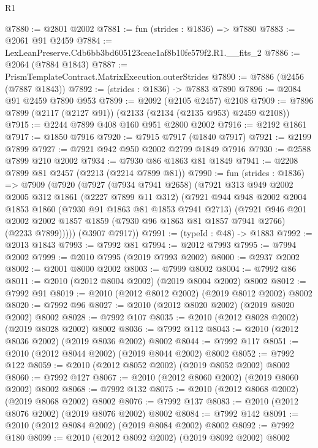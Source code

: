 \begin{lexlean}{R1}
\begin{coremodule}
@7880 := @2801 @2002
@7881 := fun (strides : @1836) => @7880
@7883 := @2061 @91 @2459
@7884 := LexLeanPreserve.Cdb6bb3bd605123ceae1af8b10fe579f2.R1.__fits_2
@7886 := @2064 (@7884 @1843)
@7887 := PrismTemplateContract.MatrixExecution.outerStrides
@7890 := @7886 (@2456 (@7887 @1843))
@7892 := (strides : @1836) -> @7883 @7890
@7896 := @2084 @91 @2459 @7890 @953
@7899 := @2092 (@2105 @2457) @2108
@7909 := @7896 @7899 (@2117 (@2127 @91)) (@2133 (@2134 (@2135 @953) @2459 @2108))
@7915 := @2244 @7899 @408 @160 @951 @2800 @2002
@7916 := @2192 @1861
@7917 := @1850 @7916
@7920 := @7915 @7917 (@1840 @7917)
@7921 := @2199 @7899
@7927 := @7921 @942 @950 @2002 @2799 @1849 @7916
@7930 := @2588 @7899 @210 @2002
@7934 := @7930 @86 @1863 @81 @1849
@7941 := @2208 @7899 @81 @2457 (@2213 (@2214 @7899 @81))
@7990 := fun (strides : @1836) =>
  @7909
    (@7920
      (@7927
        (@7934 @7941 @2658)
        (@7921
          @313
          @949
          @2002
          @2005
          @312
          @1861
          (@2227 @7899 @11 @312)
          (@7921
            @944
            @948
            @2002
            @2004
            @1853
            @1860
            (@7930 @91 @1863 @81 @1853 @7941 @2713)
            (@7921
              @946
              @201
              @2002
              @2002
              @1857
              @1859
              (@7930 @96 @1863 @81 @1857 @7941 @2766)
              (@2233 @7899)))))
      (@3907 @7917))
@7991 := (typeId : @48) -> @1883
@7992 := @2013 @1843
@7993 := @7992 @81
@7994 := @2012 @7993
@7995 := @7994 @2002
@7999 := @2010 @7995 (@2019 @7993 @2002)
@8000 := @2937 @2002
@8002 := @2001 @8000 @2002
@8003 := @7999 @8002
@8004 := @7992 @86
@8011 := @2010 (@2012 @8004 @2002) (@2019 @8004 @2002) @8002
@8012 := @7992 @91
@8019 := @2010 (@2012 @8012 @2002) (@2019 @8012 @2002) @8002
@8020 := @7992 @96
@8027 := @2010 (@2012 @8020 @2002) (@2019 @8020 @2002) @8002
@8028 := @7992 @107
@8035 := @2010 (@2012 @8028 @2002) (@2019 @8028 @2002) @8002
@8036 := @7992 @112
@8043 := @2010 (@2012 @8036 @2002) (@2019 @8036 @2002) @8002
@8044 := @7992 @117
@8051 := @2010 (@2012 @8044 @2002) (@2019 @8044 @2002) @8002
@8052 := @7992 @122
@8059 := @2010 (@2012 @8052 @2002) (@2019 @8052 @2002) @8002
@8060 := @7992 @127
@8067 := @2010 (@2012 @8060 @2002) (@2019 @8060 @2002) @8002
@8068 := @7992 @132
@8075 := @2010 (@2012 @8068 @2002) (@2019 @8068 @2002) @8002
@8076 := @7992 @137
@8083 := @2010 (@2012 @8076 @2002) (@2019 @8076 @2002) @8002
@8084 := @7992 @142
@8091 := @2010 (@2012 @8084 @2002) (@2019 @8084 @2002) @8002
@8092 := @7992 @180
@8099 := @2010 (@2012 @8092 @2002) (@2019 @8092 @2002) @8002

\end{coremodule}
\end{lexlean}
